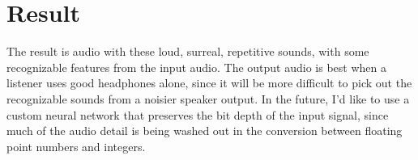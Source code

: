 \documentclass[11pt]{article}
\begin{document}
\section{Result}

The result is audio with these loud, surreal, repetitive sounds, with some recognizable features from the input audio. The output audio is best when a listener uses
good headphones alone, since it will be more difficult to pick out the recognizable sounds from a noisier speaker output. In the future, I'd like to use a custom neural network
that preserves the bit depth of the input signal, since much of the audio detail is being washed out in the conversion between floating point numbers and integers.
\end{document}
